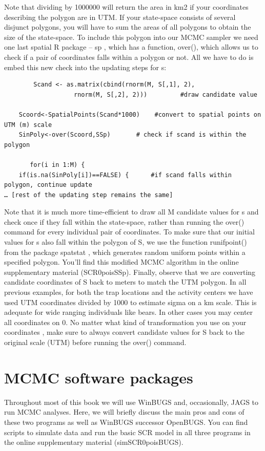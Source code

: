  Note that dividing by 1000000 will return the area in km2 if your coordinates describing the polygon are in UTM. If your state-space consists of several disjunct polygons, you will have to sum the areas of all polygons to obtain the size of the state-space.
To include this polygon into our MCMC sampler we need one last spatial R package – sp \citep{pebesma_bivand:2011}, which has a function, over(), which allows us to check if a pair of coordinates falls within a polygon or not. All we have to do is embed this new check into the updating steps for s:
\begin{verbatim}
        Scand <- as.matrix(cbind(rnorm(M, S[,1], 2),
                   rnorm(M, S[,2], 2)))	        #draw candidate value

	Scoord<-SpatialPoints(Scand*1000)    #convert to spatial points on UTM (m) scale
	SinPoly<-over(Scoord,SSp)		# check if scand is within the polygon

       for(i in 1:M) {   
	if(is.na(SinPoly[i])==FALSE) {		#if scand falls within polygon, continue update
… [rest of the updating step remains the same]
\end{verbatim}
Note that it is much more time-efficient to draw all M candidate values for s and check once if they fall within the state-space, rather than running the over() command for every individual pair of coordinates. To make sure that our initial values for s also fall within the polygon of S, we use the function runifpoint() from the package spatstat \citep{baddeley_turner:2005}, which generates random uniform points within a specified polygon. You'll find this modified MCMC algorithm in the online supplementary material (SCR0poisSSp). 
Finally, observe that we are converting candidate coordinates of S back to meters to match the UTM polygon. In all previous examples, for both the trap locations and the activity centers we have used UTM coordinates divided by 1000 to estimate sigma on a km scale. This is adequate for wide ranging individuals like bears. In other cases you may center all coordinates on 0. No matter what kind of transformation you use on your coordinates , make sure to always convert candidate values for S back to the original scale (UTM) before running the over() command. 

\section{MCMC software packages}
Throughout most of this book we will use WinBUGS and, occasionally, JAGS to run MCMC analyses. Here, we will briefly discuss the main pros and cons of these two programs as well as WinBUGS successor OpenBUGS. You can find scripts to simulate data and run the basic SCR model in all three programs in the online supplementary material (simSCR0poisBUGS). 

